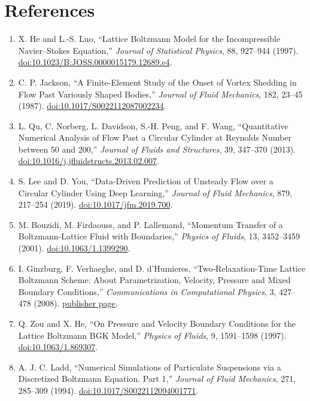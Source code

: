 \documentclass[11pt]{article}
\begin{document}
\section{References}
\begin{enumerate}
\item X. He and L.-S. Luo, ``Lattice Boltzmann Model for the Incompressible Navier--Stokes Equation,'' \emph{Journal of Statistical Physics}, 88, 927--944 (1997). \href{https://doi.org/10.1023/B:JOSS.0000015179.12689.e4}{doi:10.1023/B:JOSS.0000015179.12689.e4}.
\item C. P. Jackson, ``A Finite-Element Study of the Onset of Vortex Shedding in Flow Past Variously Shaped Bodies,'' \emph{Journal of Fluid Mechanics}, 182, 23--45 (1987). \href{https://doi.org/10.1017/S0022112087002234}{doi:10.1017/S0022112087002234}.
\item L. Qu, C. Norberg, L. Davidson, S.-H. Peng, and F. Wang, ``Quantitative Numerical Analysis of Flow Past a Circular Cylinder at Reynolds Number between 50 and 200,'' \emph{Journal of Fluids and Structures}, 39, 347--370 (2013). \href{https://doi.org/10.1016/j.jfluidstructs.2013.02.007}{doi:10.1016/j.jfluidstructs.2013.02.007}.
\item S. Lee and D. You, ``Data-Driven Prediction of Unsteady Flow over a Circular Cylinder Using Deep Learning,'' \emph{Journal of Fluid Mechanics}, 879, 217--254 (2019). \href{https://doi.org/10.1017/jfm.2019.700}{doi:10.1017/jfm.2019.700}.
\item M. Bouzidi, M. Firdaouss, and P. Lallemand, ``Momentum Transfer of a Boltzmann-Lattice Fluid with Boundaries,'' \emph{Physics of Fluids}, 13, 3452--3459 (2001). \href{https://doi.org/10.1063/1.1399290}{doi:10.1063/1.1399290}.
\item I. Ginzburg, F. Verhaeghe, and D. d'Humieres, ``Two-Relaxation-Time Lattice Boltzmann Scheme: About Parametrization, Velocity, Pressure and Mixed Boundary Conditions,'' \emph{Communications in Computational Physics}, 3, 427--478 (2008). \href{https://www.global-sci.com/cicp/article/view/5523}{publisher page}.
\item Q. Zou and X. He, ``On Pressure and Velocity Boundary Conditions for the Lattice Boltzmann BGK Model,'' \emph{Physics of Fluids}, 9, 1591--1598 (1997). \href{https://doi.org/10.1063/1.869307}{doi:10.1063/1.869307}.
\item A. J. C. Ladd, ``Numerical Simulations of Particulate Suspensions via a Discretized Boltzmann Equation. Part 1,'' \emph{Journal of Fluid Mechanics}, 271, 285--309 (1994). \href{https://doi.org/10.1017/S0022112094001771}{doi:10.1017/S0022112094001771}.

\end{enumerate}
\end{document}
